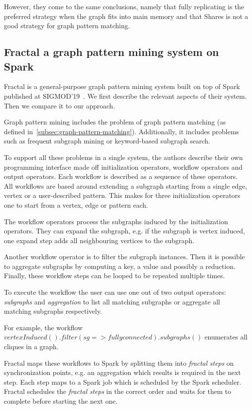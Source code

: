 However, they come to the same conclusions, namely that fully replicating is the preferred strategy
when the graph fits into main memory and that Shares is not a good strategy for graph pattern matching.

\subsection{Fractal a graph pattern mining system on Spark} \label{subsec:fractal}
Fractal is a general-purpose graph pattern mining system built on top of Spark published at SIGMOD'19~\cite{fractal}.
We first describe the relevant aspects of their system.
Then we compare it to our approach.

Graph pattern mining includes the problem of graph pattern matching (as defined in~\cref{subsec:graph-pattern-matching}).
Additionally, it includes problems such as frequent subgraph mining or keyword-based subgraph search.

To support all these problems in a single system, the authors describe their own programming interface made
off initialization operators, workflow operators and output operators.
Each workflow is described as a sequence of these operators.
All workflows are based around extending a subgraph starting from a single edge, vertex or a user-described
pattern.
This makes for three initialization operators one to start from a vertex, edge or pattern each.

The workflow operators process the subgraphs induced by the initialization operators.
They can expand the subgraph, e.g. if the subgraph is vertex induced, one expand step adds all neighbouring
vertices to the subgraph.

Another workflow operator is to filter the subgraph instances.
Then it is possible to aggregate subgraphs by computing a key, a value and possibly a reduction.
Finally, these workflow steps can be looped to be repeated multiple times.

To execute the workflow the user can use one out of two output operators: \textit{subgraphs} and
\textit{aggregation} to list all matching subgraphs or aggregate all matching subgraphs respectively.

For example, the workflow $vertexInduced().filter(sg => fully connected).subgraphs()$ enumerates
all cliques in a graph.

Fractal maps these workflows to Spark by splitting them into \textit{fractal steps} on
synchronization points, e.g. an aggregation which results is required in the next step.
Each step maps to a Spark job which is scheduled by the Spark scheduler.
Fractal schedules the \textit{fractal steps} in the correct order and waits for them to complete
before starting the next one.

